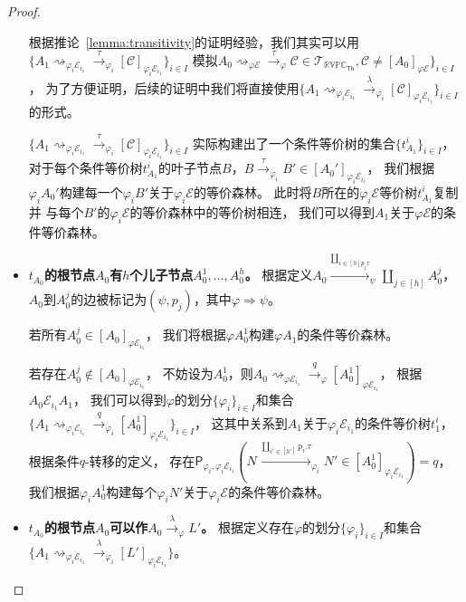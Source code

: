 \begin{proof}
\begin{itemize}
{         根据推论~\ref{lemma:transitivity}的证明经验，我们其实可以用$\{A_1\rightsquigarrow_{\varphi_i\mathcal{E}_{i_1}}\stackrel{\tau}{\rightarrow}_{\varphi_i}[\mathcal{C}]_{\varphi_i\mathcal{E}_{i_1}}\}_{i\in I}$
         模拟$A_0\rightsquigarrow_{\varphi\mathcal{E}}\stackrel{\tau}{\rightarrow}_{\varphi} \mathcal{C}\in \mathcal{T}_{\mathbb{RVPC}_{\mathsf{Th}}},\mathcal{C}\neq [A_0]_{\varphi\mathcal{E}}\}_{i\in I}$，
         为了方便证明，后续的证明中我们将直接使用$\{A_1\rightsquigarrow_{\varphi_i\mathcal{E}_{i_1}}\stackrel{\lambda}{\rightarrow}_{\varphi_i}[\mathcal{C}]_{\varphi_i\mathcal{E}_{i_1}}\}_{i\in I}$的形式。
         
         $\{A_1\rightsquigarrow_{\varphi_i\mathcal{E}_{i_1}}\stackrel{\tau}{\rightarrow}_{\varphi_i}[\mathcal{C}]_{\varphi_i\mathcal{E}_{i_1}}\}_{i\in I}$
         实际构建出了一个条件等价树的集合$\{t_{A_1}^{i}\}_{i\in I}$，
         对于每个条件等价树$t_{A_1}^i$的叶子节点$B$，$B\stackrel{\tau}{\rightarrow}_{\varphi_i}B'\in [A_0']_{\varphi_i\mathcal{E}_{i_1}}$，
         我们根据$\varphi_i A_0'$构建每一个$\varphi_i B'$关于$\varphi_i\mathcal{E}$的等价森林。
         此时将$B$所在的$\varphi_i\mathcal{E}$等价树$t_{A_1}^{i}$复制并
         与每个$B'$的$\varphi_i\mathcal{E}$的等价森林中的等价树相连，
         我们可以得到$A_1$关于$\varphi\mathcal{E}$的条件等价森林。
      }
      \item {
         \textbf{$t_{A_0}$的根节点$A_0$有$h$个儿子节点$A_0^1,\dots,A_0^h$。}
         根据定义$A_0\stackrel{\coprod_{i\in [h]p_j\tau}}{\rightarrow}_{\psi} \coprod_{j\in [h]}A_0^j$，
         $A_0$到$A_0^j$的边被标记为$(\psi, p_j)$，其中$\varphi\Rightarrow\psi$。

         若所有$A_0^j\in [A_0]_{\varphi\mathcal{E}_{i_1}}$，
         我们将根据$\varphi A_0^1$构建$\varphi A_1$的条件等价森林。

         若存在$A_0^j\notin [A_0]_{\varphi\mathcal{E}_{i_1}}$，
         不妨设为$A_0^1$，则$A_0\rightsquigarrow_{\varphi\mathcal{E}_{i_1}}\stackrel{q}{\rightarrow}_{\varphi} [A_0^1]_{\varphi\mathcal{E}_{i_1}}$，
         根据$A_0\mathcal{E}_{i_1}A_1$，
         我们可以得到$\varphi$的划分$\{\varphi_i\}_{i\in I}$和集合
         $\{A_1\rightsquigarrow_{\varphi_i\mathcal{E}_{i_1}}\stackrel{q}{\rightarrow}_{\varphi_i} [A_0^1]_{\varphi_i\mathcal{E}_{i_1}}\}_{i\in I}$，
         这其中关系到$A_1$关于$\varphi_i\mathcal{E}_{i_1}$的条件等价树$t_1^i$，
         根据条件$q$-转移的定义，
         存在$\mathsf{P}_{\varphi_i,\varphi_i\mathcal{E}_{i_1}}(N\stackrel{\coprod_{i'\in [h']}p_{i'}\tau}{\longrightarrow}_{\varphi_i} N'\in [A_0^1]_{\varphi_i\mathcal{E}_{i_1}}) = q$，
         我们根据$\varphi_i A_0^1$构建每个$\varphi_i N'$关于$\varphi_i\mathcal{E}$的条件等价森林。
      }
      \item {
         \textbf{$t_{A_0}$的根节点$A_0$可以作$A_0\stackrel{\lambda}{\rightarrow}_{\varphi} L'$。}
         根据定义存在$\varphi$的划分$\{\varphi_i\}_{i\in I}$和集合
         $\{A_1\rightsquigarrow_{\varphi_i\mathcal{E}_{i_1}}\stackrel{\lambda}{\rightarrow}_{\varphi_i} [L']_{\varphi_i\mathcal{E}_{i_1}}\}$。
      }
   \end{itemize}


\end{proof}
